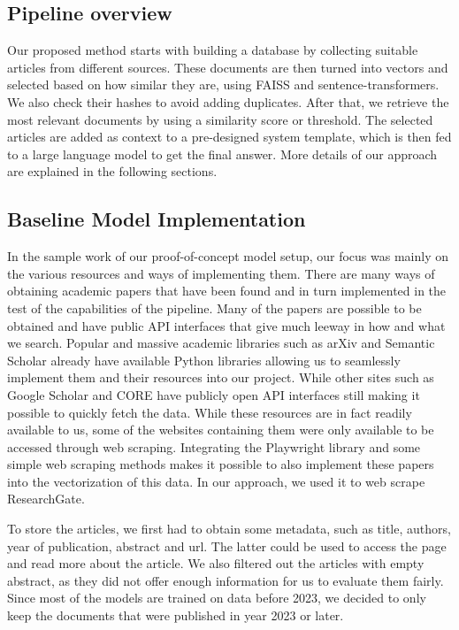 \documentclass[fleqn,moreauthors,10pt]{ds_report}
\begin{document}
\subsection*{Pipeline overview}
Our proposed method starts with building a database by collecting suitable articles from different sources. These documents are then turned into vectors and selected based on how similar they are, using FAISS and sentence-transformers. We also check their hashes to avoid adding duplicates. After that, we retrieve the most relevant documents by using a similarity score or threshold. The selected articles are added as context to a pre-designed system template, which is then fed to a large language model to get the final answer. More details of our approach are explained in the following sections.

\subsection*{Baseline Model Implementation}
In the sample work of our proof-of-concept model setup, our focus was mainly on the various resources and ways of implementing them. There are many ways of obtaining academic papers that have been found and in turn implemented in the test of the capabilities of the pipeline. Many of the papers are possible to be obtained and have public API interfaces that give much leeway in how and what we search. Popular and massive academic libraries such as arXiv and Semantic Scholar already have available Python libraries allowing us to seamlessly implement them and their resources into our project. While other sites such as Google Scholar and CORE have publicly open API interfaces still making it possible to quickly fetch the data. While these resources are in fact readily available to us, some of the websites containing them were only available to be accessed through web scraping. Integrating the Playwright library and some simple web scraping methods makes it possible to also implement these papers into the vectorization of this data. In our approach, we used it to web scrape ResearchGate.

To store the articles, we first had to obtain some metadata, such as title, authors, year of publication, abstract and url. The latter could be used to access the page and read more about the article. We also filtered out the articles with empty abstract, as they did not offer enough information for us to evaluate them fairly. Since most of the models are trained on data before 2023, we decided to only keep the documents that were published in year 2023 or later.
\end{document}
